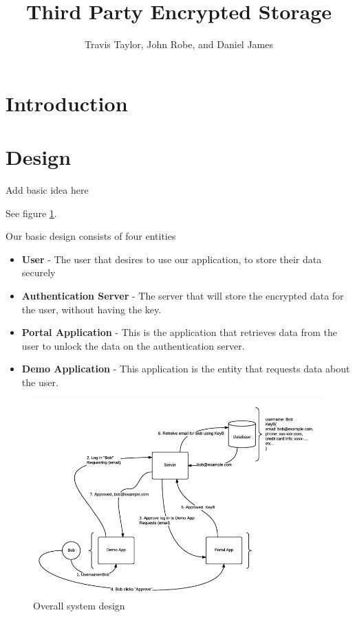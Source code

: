 \documentclass[letterpaper,twocolumn,10pt]{article}
\title{Third Party Encrypted Storage}
\author{Travis Taylor, John Robe, and Daniel James}
\affil{School of Computing, University of Utah}
\begin{document}
\maketitle

\section{Introduction}

\section{Design}

Add basic idea here

See figure \ref{design}.

Our basic design consists of four entities
\begin{itemize}
    \item \textbf{User} - The user that desires to use our application, to store their data securely
    \item \textbf{Authentication Server} - The server that will store the encrypted data for the user, without having the key.
    \item \textbf{Portal Application} - This is the application that retrieves data from the user to unlock the data on the authentication server.
    \item \textbf{Demo Application} - This application is the entity that requests data about the user.
\end{itemize}

\begin{figure}[ht]
\centering
\includegraphics[width=\textwidth]{Design}
\caption{Overall system design}
\label{design}
\end{figure}
\end{document}
